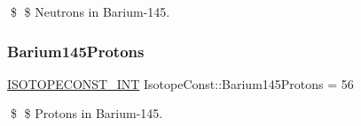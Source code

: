 \$ \$ Neutrons in Barium-\/145. \mbox{\label{group___isotope_const-_barium-_ba145_ga1e315cde6460c09814eb53efb414a6d7}} 
\subsubsection{\texorpdfstring{Barium145\+Protons}{Barium145Protons}}
{\footnotesize\ttfamily \mbox{\hyperlink{group___isotope_const-_macros_ga5f18360b3e99483a35c32d789e62621c}{I\+S\+O\+T\+O\+P\+E\+C\+O\+N\+S\+T\+\_\+\+I\+NT}} Isotope\+Const\+::\+Barium145\+Protons = 56}

\$ \$ Protons in Barium-\/145. 